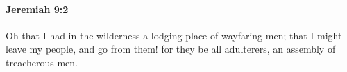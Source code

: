 
		\paragraph{Jeremiah 9:2} %
			\label{JEREMIAH-9-2}

			Oh that I had in the wilderness a lodging place of wayfaring men; that I might leave my people, and go from them! for they be all adulterers, an assembly of treacherous men.


